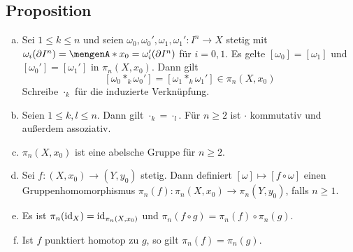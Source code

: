 \subsection[Proposition: Gruppenstruktur von $\pi_n(X,x_0)$ und induzierte Abbildungen]{Proposition} %
\label{sub:146}
\begin{enumerate}[a)]
	\item Sei $1 \le k \le n$ und seien $\omega_0, \omega_0', \omega_1, \omega_1' : I^n \to X$ stetig mit $\omega_i (\partial I^n) = \set{x_0} = \omega_i'(\partial I^n)$ 
	für $i=0,1$. Es gelte $[\omega_0] = [\omega_1]$ und $[\omega_0'] = [\omega_1']$ in $\pi_n(X,x_0)$. Dann gilt 
	\[
		[\omega_0 *_k \omega_0'] = [\omega_1 *_k \omega_1'] \in \pi_n(X, x_0)
	\]
	Schreibe $\cdot_k$ für die induzierte Verknüpfung.
	\item Seien $1 \le k,l \le n$. Dann gilt $\cdot_k = \cdot_l$. Für $n \ge 2$ ist $\cdot $ kommutativ und außerdem assoziativ.
	\item $\pi_n(X,x_0)$ ist eine abelsche Gruppe für $n \ge 2$.
	\item\label{enum:146:4} Sei $f : (X,x_0) \to (Y,y_0)$ stetig. Dann definiert $[\omega] \mapsto [f \circ \omega]$ einen Gruppenhomomorphismus $\pi_n(f) : \pi_n(X,x_0) \to \pi_n(Y,y_0)$,
	falls $n \ge 1$.
	\item Es ist $\pi_n(\operatorname{id}_X) = \operatorname{id}_{\pi_n(X,x_0)}$ und $\pi_n(f \circ g) = \pi_n(f) \circ \pi_n(g)$.
	\item Ist $f$ punktiert homotop zu $g$, so gilt $\pi_n(f) = \pi_n(g)$.
\end{enumerate}
